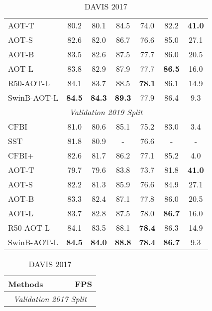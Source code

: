 \documentclass{article}
\newcommand{\pub}[1]{{\color{gray}{\tiny{[{#1}]}}}}
\begin{document}
\begin{table}[t!]
\begin{subtable}[t]{.54\textwidth}
\begin{tabular}{lcccccc}
AOT-T & 80.2  &  80.1  & 84.5  & 74.0  & 82.2 & \textbf{41.0} \\
AOT-S & 82.6  &  82.0  & 86.7  & 76.6  & 85.0 & {27.1} \\
AOT-B & 83.5  &  {82.6}  & 87.5  & {77.7}  & 86.0 & 20.5 \\
AOT-L & {83.8}  &  {82.9}  & {87.9}  & {77.7}  & \textbf{86.5} & 16.0 \\
R50-AOT-L & {84.1}  &  {83.7}  & {88.5}  & \textbf{78.1}  & {86.1} & 14.9 \\
SwinB-AOT-L & \textbf{84.5}  &  \textbf{84.3}  & \textbf{89.3}  & {77.9}  & {86.4} & 9.3 \\
\midrule[1pt]
\multicolumn{7}{c}{\textit{Validation 2019 Split}} \\
\midrule[1pt]
CFBI\pub{ECCV20}~\cite{cfbi}  &  81.0  &  {80.6}  & {85.1}  & {75.2}  & {83.0} & 3.4  \\
SST\pub{CVPR21}~\cite{sstvos} & 81.8  &  80.9  &  -  &  76.6  &  - & - \\
CFBI+\pub{TPAMI21}~\cite{cfbip} &  82.6  &  81.7  & 86.2  & 77.1  & 85.2 & 4.0 \\
\hline
AOT-T &  79.7  &  79.6  & 83.8  & 73.7  & 81.8 & \textbf{41.0} \\
AOT-S &  82.2 &  81.3  & 85.9  & 76.6  & 84.9 & {27.1} \\
AOT-B &  83.3 &  {82.4}  & {87.1}  & 77.8  & 86.0 & 20.5 \\
AOT-L &  {83.7} &  {82.8}  & {87.5}  & {78.0}  & \textbf{86.7} & 16.0 \\
R50-AOT-L & {84.1}  &  {83.5}  & {88.1}  & \textbf{78.4}  & {86.3} & 14.9 \\
SwinB-AOT-L & \textbf{84.5}  &  \textbf{84.0}  & \textbf{88.8}  & \textbf{78.4}  & \textbf{86.7} & 9.3 \\

\bottomrule[1.5pt]
\end{tabular}

\end{subtable}
\begin{subtable}[t]{.45\textwidth}










\caption{DAVIS 2017}\label{tab:davis}
\begin{center}
\small
\vspace{-2.3mm}
\setlength{\tabcolsep}{4pt}
\begin{tabular}{l c c c c}
\toprule[1.5pt]
 Methods  &  &  &  & FPS \\
\midrule[1pt]
\multicolumn{5}{c}{\textit{Validation 2017 Split}} \\
\midrule[1pt]



\end{tabular}
\end{center}
\end{subtable}
\end{table}
\end{document}
